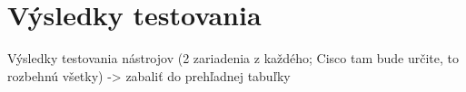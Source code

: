 \chapter{Výsledky testovania}

Výsledky testovania nástrojov (2 zariadenia z každého; Cisco tam bude určite, to rozbehnú všetky) -> zabaliť do prehľadnej tabuľky